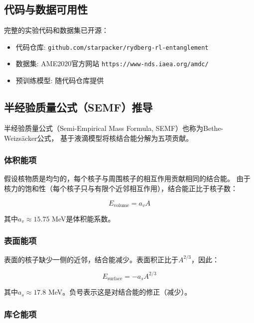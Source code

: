 \documentclass[12pt, a4paper]{article}
\begin{document}
\subsection{代码与数据可用性}

完整的实验代码和数据集已开源：
\begin{itemize}
  \item 代码仓库: \texttt{github.com/starpacker/rydberg-rl-entanglement}
  \item 数据集: AME2020官方网站 \texttt{https://www-nds.iaea.org/amdc/}
  \item 预训练模型: 随代码仓库提供
\end{itemize}

\subsection{半经验质量公式（SEMF）推导}

半经验质量公式（Semi-Empirical Mass Formula, SEMF）也称为Bethe-Weizsäcker公式，
基于液滴模型将核结合能分解为五项贡献。

\subsubsection{体积能项}

假设核物质是均匀的，每个核子与周围核子的相互作用贡献相同的结合能。
由于核力的饱和性（每个核子只与有限个近邻相互作用），结合能正比于核子数：

\begin{equation}
  E_{\text{volume}} = a_v A
\end{equation}

其中$a_v \approx 15.75$ MeV是体积能系数。

\subsubsection{表面能项}

表面的核子缺少一侧的近邻，结合能减少。表面积正比于$A^{2/3}$，因此：

\begin{equation}
  E_{\text{surface}} = -a_s A^{2/3}
\end{equation}

其中$a_s \approx 17.8$ MeV。负号表示这是对结合能的修正（减少）。

\subsubsection{库仑能项}
\end{document}
